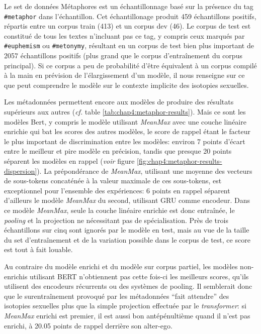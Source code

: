 Le set de données Métaphores est un échantillonnage basé sur la présence du tag \texttt{\#metaphor} dans l'échantillon. Cet échantillonage produit 459 échantillons positifs, répartis entre un corpus train (413) et un corpus dev (46). Le corpus de test est constitué de tous les textes n'incluant pas ce tag, y compris ceux marqués par \texttt{\#euphemism} ou \texttt{\#metonymy}, résultant en un corpus de test bien plus important de 2057 échantillons positifs (plus grand que le corpus d'entraînement du corpus principal). Si ce corpus a peu de probabilité d'être équivalent à un corpus compilé à la main en prévision de l'élargissement d'un modèle, il nous renseigne sur ce que peut comprendre le modèle sur le contexte implicite des isotopies sexuelles.

Les métadonnées permettent encore aux modèles de produire des résultats supérieurs aux autres (\textit{cf.} table \ref{tab:chap4:metaphor-results}). Mais ce sont les modèles Bert, y compris le modèle utilisant \textit{MeanMax} avec une couche linéaire enrichie qui bat les scores des autres modèles, le score de rappel étant le facteur le plus important de discrimination entre les modèles: environ 7 points d'écart entre le meilleur et pire modèle en précision, tandis que presque 20 points séparent les modèles en rappel (\textit{voir} figure \ref{fig:chap4:metaphor-results-dispersion}). La prépondérance de \textit{MeanMax}, utilisant une moyenne des vecteurs de sous-tokens concaténée à la valeur maximale de ces sous-tokens, est exceptionnel pour l'ensemble des expériences: 6 points en rappel séparent d'ailleurs le modèle \textit{MeanMax} du second, utilisant GRU comme encodeur. Dans ce modèle \textit{MeanMax}, seule la couche linéaire enrichie est donc entraînée, le \textit{pooling} et la projection ne nécessitant pas de spécialisation. Près de trois échantillons sur cinq sont ignorés par le modèle en test, mais au vue de la taille du set d'entraînement et de la variation possible dans le corpus de test, ce score est tout à fait louable.

Au contraire du modèle enrichi et du modèle sur corpus partiel, les modèles non-enrichis utilisant BERT n'obtiennent pas cette fois-ci les meilleurs scores, qu'ils utilisent des encodeurs récurrents ou des systèmes de pooling. Il semblerait donc que le surentraînement provoqué par les métadonnées ``fait attendre'' des isotopies sexuelles plus que la simple projection effectuée par le \textit{transformer}: si \textit{MeanMax} enrichi est premier, il est aussi bon antépénultième quand il n'est pas enrichi, à 20.05 points de rappel derrière son alter-ego.

